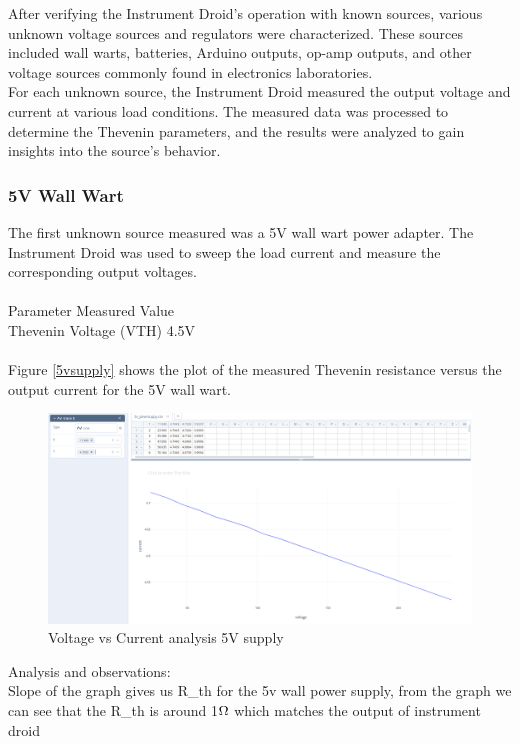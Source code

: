 \documentclass[a4paper,11pt]{article}%
\begin{document}
After verifying the Instrument Droid's operation with known sources, various unknown voltage sources and regulators were characterized. These sources included wall warts, batteries, Arduino outputs, op-amp outputs, and other voltage sources commonly found in electronics laboratories.\\

For each unknown source, the Instrument Droid measured the output voltage and current at various load conditions. The measured data was processed to determine the Thevenin parameters, and the results were analyzed to gain insights into the source's behavior.\\

\subsubsection{5V Wall Wart} 


The first unknown source measured was a 5V wall wart power adapter. The Instrument Droid was used to sweep the load current and measure the corresponding output voltages.\\\\

Parameter	Measured Value\\
Thevenin Voltage (VTH)	4.5V\\
\\
Figure \ref{5vsupply} shows the plot of the measured Thevenin resistance versus the output current for the 5V wall wart.\\


\begin{figure}[H]
	\centering
	\includegraphics[scale=0.30]{figures/5v.png}
  \caption{Voltage vs Current analysis 5V supply}
  \label{fig:5vsupply}
\end{figure}

Analysis and observations:\\
Slope of the graph gives us R\_th for the 5v wall power supply, from the graph we can see that the R\_th is around 1$\ohm$ which matches the output of instrument droid
\end{document}
